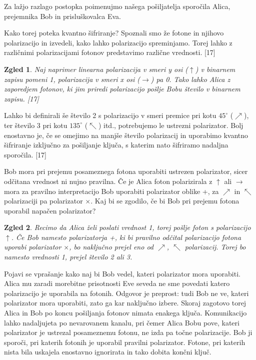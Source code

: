 \documentclass[A4paper, 11pt]{article}
\newtheorem{zgled}{Zgled}
\begin{document}
Za lažjo razlago postopka poimenujmo našega pošiljatelja sporočila Alica, prejemnika Bob in prisluškovalca Eva.

Kako torej poteka kvantno šifriranje?
Spoznali smo že fotone in njihovo polarizacijo in izvedeli, kako lahko polarizacijo spreminjamo. Torej lahko z različnimi polarizacijami fotonov predstavimo različne vrednosti. [17]

\begin{zgled}
Naj naprimer linearna polarizacija v smeri y osi ($\uparrow$) v binarnem zapisu pomeni 1, polarizacija v smeri x osi ($\rightarrow$) pa 0. Tako lahko Alica z zaporedjem fotonov, ki jim priredi polarizacijo pošlje Bobu število v binarnem zapisu. [17]
\end{zgled}

Lahko bi definirali še število 2 s polarizacijo v smeri premice pri kotu $45^{\circ}$ ($\nearrow$), ter število 3 pri kotu $135^{\circ}$ ($\nwarrow$) itd., potrebujemo le ustrezni polarizator. Bolj enostavno je, če se omejimo na manjše število polarizacij in uporabimo kvantno šifriranje izključno za pošiljanje ključa, s katerim nato šifriramo nadaljna sporočila. [17]

Bob mora pri prejemu posameznega fotona uporabiti ustrezen polarizator, sicer odčitana vrednost ni nujno pravilna. Če je Alica foton polarizirala z $\uparrow$ ali $\rightarrow$ mora za pravilno interpretacijo Bob uporabiti polarizator oblike +, za $\nearrow$ in $\nwarrow$ polarizaciji pa polarizator $\times$. Kaj bi se zgodilo, če bi Bob pri prejemu fotona uporabil napačen polarizator? 

\begin{zgled}
Recimo da Alica želi poslati vrednost 1, torej pošlje foton s polarizacijo $\uparrow$. Če Bob namesto polarizatorja +, ki bi pravilno odčital polarizacijo fotona uporabi polarizator $\times$, bo naključno prejel eno od $\nearrow$, $\nwarrow$ polarizacij. Torej bo namesto vrednosti 1, prejel število 2 ali 3.
\end{zgled}

Pojavi se vprašanje kako naj bi Bob vedel, kateri polarizator mora uporabiti. Alica mu zaradi morebitne prisotnosti Eve seveda ne sme povedati katero polarizacijo je uporabila na fotonih. Odgovor je preprost: tudi Bob ne ve, kateri polarizator mora uporabiti, zato ga kar naključno izbere. Skoraj zagotovo torej Alica in Bob po koncu pošiljanja fotonov nimata enakega ključa. Komunikacijo lahko nadaljujeta po nevarovanem kanalu, pri čemer Alica Bobu pove, kateri polarizator je ustrezal posameznemu fotonu, ne izda pa točne polarizacije. Bob ji sporoči, pri katerih fotonih je uporabil pravilni polarizator. Fotone, pri katerih nista bila uskajela enostavno ignorirata in tako dobita končni ključ.
\end{document}
